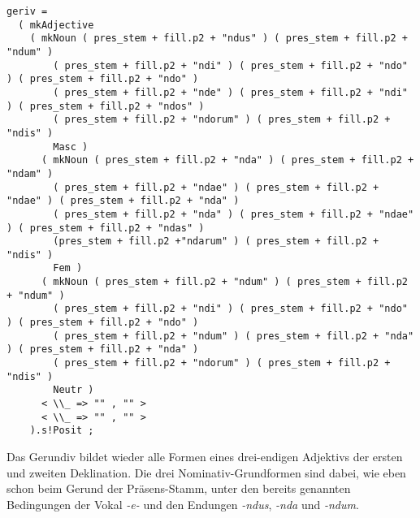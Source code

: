 \begin{lstlisting}[float=h!tp,caption={Ausschnitt aus der Funktion \texttt{mkDeponent} um Gerundiv-Verbformen zu bilden (vgl. \textbf{ResLat.gf})},label={GF-Res-MkDeponent-Geriv},basicstyle=\small]
geriv =
  ( mkAdjective
    ( mkNoun ( pres_stem + fill.p2 + "ndus" ) ( pres_stem + fill.p2 + "ndum" ) 
        ( pres_stem + fill.p2 + "ndi" ) ( pres_stem + fill.p2 + "ndo" ) ( pres_stem + fill.p2 + "ndo" ) 
        ( pres_stem + fill.p2 + "nde" ) ( pres_stem + fill.p2 + "ndi" ) ( pres_stem + fill.p2 + "ndos" ) 
        ( pres_stem + fill.p2 + "ndorum" ) ( pres_stem + fill.p2 + "ndis" ) 
        Masc )
      ( mkNoun ( pres_stem + fill.p2 + "nda" ) ( pres_stem + fill.p2 + "ndam" ) 
        ( pres_stem + fill.p2 + "ndae" ) ( pres_stem + fill.p2 + "ndae" ) ( pres_stem + fill.p2 + "nda" ) 
        ( pres_stem + fill.p2 + "nda" ) ( pres_stem + fill.p2 + "ndae" ) ( pres_stem + fill.p2 + "ndas" ) 
        (pres_stem + fill.p2 +"ndarum" ) ( pres_stem + fill.p2 + "ndis" ) 
        Fem )
      ( mkNoun ( pres_stem + fill.p2 + "ndum" ) ( pres_stem + fill.p2 + "ndum" ) 
        ( pres_stem + fill.p2 + "ndi" ) ( pres_stem + fill.p2 + "ndo" ) ( pres_stem + fill.p2 + "ndo" ) 
        ( pres_stem + fill.p2 + "ndum" ) ( pres_stem + fill.p2 + "nda" ) ( pres_stem + fill.p2 + "nda" ) 
        ( pres_stem + fill.p2 + "ndorum" ) ( pres_stem + fill.p2 + "ndis" ) 
        Neutr )
      < \\_ => "" , "" >
      < \\_ => "" , "" >
    ).s!Posit ;
\end{lstlisting}
Das Gerundiv bildet wieder alle Formen eines drei-endigen Adjektivs der ersten und zweiten Deklination. Die drei Nominativ-Grundformen sind dabei, wie eben schon beim Gerund der Präsens-Stamm, unter den bereits genannten Bedingungen der Vokal \textit{-e-} und den Endungen \textit{-ndus}, \textit{-nda} und \textit{-ndum}. \par
